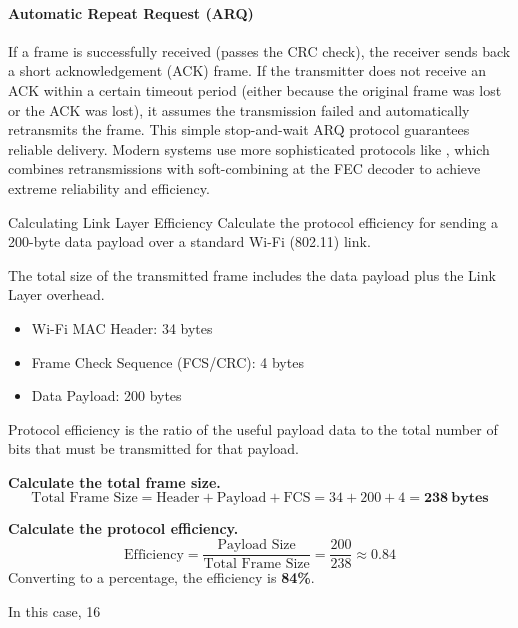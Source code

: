 \paragraph{Automatic Repeat Request (ARQ)}
If a frame is successfully received (passes the CRC check), the receiver sends back a short acknowledgement (ACK) frame. If the transmitter does not receive an ACK within a certain timeout period (either because the original frame was lost or the ACK was lost), it assumes the transmission failed and automatically retransmits the frame. This simple stop-and-wait ARQ protocol guarantees reliable delivery. Modern systems use more sophisticated protocols like , which combines retransmissions with soft-combining at the FEC decoder to achieve extreme reliability and efficiency.

\begin{workedexample}{Calculating Link Layer Efficiency}
    Calculate the protocol efficiency for sending a 200-byte data payload over a standard Wi-Fi (802.11) link.
    
    The total size of the transmitted frame includes the data payload plus the Link Layer overhead.
    \begin{itemize}
        \item Wi-Fi MAC Header: 34 bytes
        \item Frame Check Sequence (FCS/CRC): 4 bytes
        \item Data Payload: 200 bytes
    \end{itemize}

    Protocol efficiency is the ratio of the useful payload data to the total number of bits that must be transmitted for that payload.
    
    \begin{derivationsteps}
        \step \textbf{Calculate the total frame size.}
        \[ \text{Total Frame Size} = \text{Header} + \text{Payload} + \text{FCS} = 34 + 200 + 4 = \mathbf{238~\text{bytes}} \]
        
        \step \textbf{Calculate the protocol efficiency.}
        \[ \text{Efficiency} = \frac{\text{Payload Size}}{\text{Total Frame Size}} = \frac{200}{238} \approx 0.84 \]
        Converting to a percentage, the efficiency is \textbf{84\%}.
    \end{derivationsteps}

    In this case, 16%
\end{workedexample}

